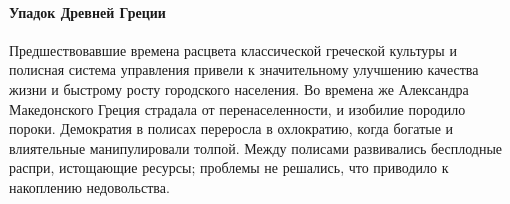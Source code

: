 
\paragraph{Упадок Древней Греции}
Предшествовавшие времена расцвета классической греческой культуры и полисная система управления привели к значительному улучшению качества жизни и быстрому росту городского населения. 
Во времена же Александра Македонского Греция страдала от перенаселенности, и изобилие породило пороки. Демократия в полисах переросла в охлократию, когда богатые и влиятельные манипулировали толпой. Между полисами развивались бесплодные распри, истощающие ресурсы; проблемы не решались, что приводило к накоплению недовольства.



